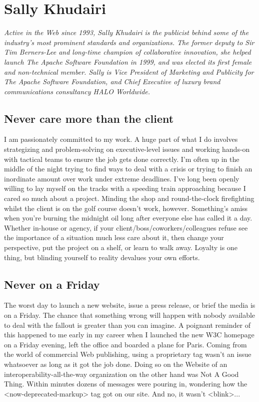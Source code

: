 \chapter{Sally Khudairi}
\textit{Active in the Web since 1993, Sally Khudairi is the publicist behind
some of the industry's most prominent standards and organizations. The former
deputy to Sir Tim Berners-Lee and long-time champion of collaborative
innovation, she helped launch The Apache Software Foundation in 1999, and was
elected its first female and non-technical member. Sally is Vice President of
Marketing and Publicity for The Apache Software Foundation, and Chief Executive
of luxury brand communications consultancy HALO Worldwide.}

\section*{Never care more than the client}
I am passionately committed to my work. A huge part of what I do involves
strategizing and problem-solving on executive-level issues and working hands-on
with tactical teams to ensure the job gets done correctly. I'm often up in the
middle of the night trying to find ways to deal with a crisis or trying to
finish an inordinate amount over work under extreme deadlines. I've long been
openly willing to lay myself on the tracks with a speeding train approaching
because I cared so much about a project. Minding the shop and round-the-clock
firefighting whilst the client is on the golf course doesn't work, however.
Something's amiss when you're burning the midnight oil long after everyone else
has called it a day. Whether in-house or agency, if your
client/boss/coworkers/colleagues refuse see the importance of a situation much
less care about it, then change your perspective, put the project on a shelf, or
learn to walk away. Loyalty is one thing, but blinding yourself to reality
devalues your own efforts.

\section*{Never on a Friday}
The worst day to launch a new website, issue a press release, or brief the media
is on a Friday. The chance that something wrong will happen with nobody
available to deal with the fallout is greater than you can imagine. A poignant
reminder of this happened to me early in my career when I launched the new W3C
homepage on a Friday evening, left the office and boarded a plane for Paris.
Coming from the world of commercial Web publishing, using a proprietary tag
wasn't an issue whatsoever as long as it got the job done. Doing so on the
Website of an interoperability-all-the-way organization on the other hand was
Not A Good Thing. Within minutes dozens of messages were pouring in, wondering
how the <now-deprecated-markup> tag got on our site. And no, it wasn't
<blink>...

